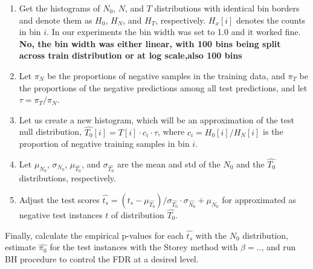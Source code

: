 \documentclass{article}
\begin{document}
\begin{enumerate}%
	\itemsep-3pt  		
	\item Get the histograms of $N_0$, $N$, and $T$ distributions with identical bin borders and denote them as $H_0$, $H_N$, and $H_T$, respectively. $H_x[i]$ denotes the counts in bin $i$.  In our experiments the bin width was set to 1.0 and it worked fine. \textbf{No, the bin width was either linear, with 100 bins being split across train distribution or at log scale,also 100 bins}
	
	\item Let $\pi_N$ be the proportions of negative samples in the training data, and $\pi_T$ be the proportions of the negative predictions among all test predictions, and let $\tau=\pi_T/\pi_N$. 
	
	\item Let us create a new histogram, which will be an approximation of the test null distribution, $\hat{T_0}[i]=T[i]\cdot c_i\cdot \tau$, where $c_i=H_0[i]/H_N[i]$ is the proportion of negative training samples in bin $i$.
	
	\item Let $\mu_{N_0}$, $\sigma_{N_0}$, $\mu_{\hat{T_0}}$, and $\sigma_{\hat{T_0}}$ are the mean and std of the $N_0$ and the $\hat{T_0}$ distributions, respectively. 
	
	\item Adjust the test scores $\hat{t_s} = (t_s-\mu_{\hat{T_0}})/\sigma_{\hat{T_0}} \cdot \sigma_{\hat{N_0}} + \mu_{N_0}$ for approximated as negative test instances $t$ of distribution $\hat{T_0}$.
\end{enumerate}


	Finally, calculate the empirical p-values for each $\hat{t_s}$ with the $N_0$ distribution, estimate  $\hat{\pi_0}$ for the test instances with the Storey method with $\beta= ..$, and run BH procedure to control the FDR at a desired level.
	
	
	
%	
%	
	
\end{document}
